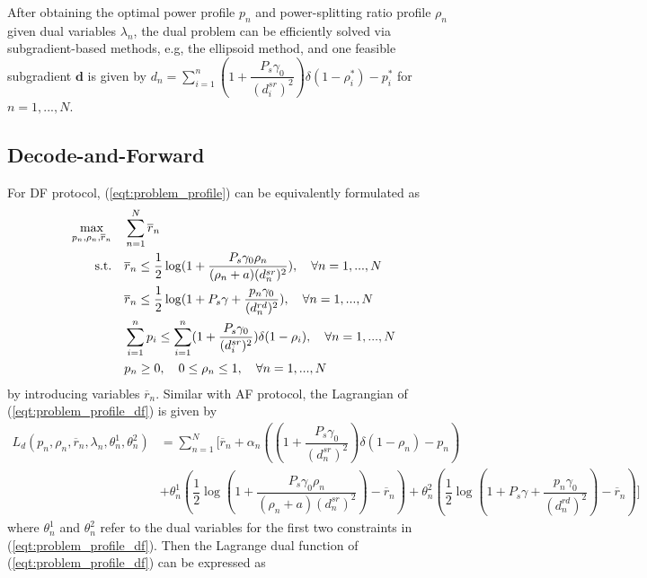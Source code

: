 \documentclass[12pt, draftclsnofoot, onecolumn]{IEEEtran}
\begin{document}
After obtaining the optimal power profile $p_{n}$ and power-splitting ratio profile $\rho_{n}$ given dual variables $\lambda_{n}$, the dual problem can be efficiently solved via subgradient-based methods, e.g, the ellipsoid method\cite{6760603}, and one feasible subgradient $\bm{d}$ is given by $d_{n}=\sum\limits _{i=1}^{n}(1+\dfrac{P_{s}\gamma_{0}}{(d^{sr}_{i})^{2}})\delta(1-\rho^{*}_{i})-p^{*}_{i}$ for $n=1,...,N$.

\subsection{Decode-and-Forward}
For DF protocol, (\ref{eqt:problem_profile}) can be equivalently formulated as 
\begin{equation}\label{eqt:problem_profile_df}
\begin{aligned}
\max\limits_{p_{n},\rho_{n},\overline{r}_{n}}\quad &\sum\limits _{n=1}^{N}\overline{r}_{n}\\
{\rm s.t.}\quad &\overline{r}_{n}\leq\dfrac{1}{2}\log (1+\dfrac{P_{s}\gamma_{0}\rho_{n}}{(\rho_{n}+a)(d^{sr}_{n})^{2}}),\quad\forall n=1,...,N\\
&\overline{r}_{n}\leq\dfrac{1}{2}\log (1+P_{s}\gamma+\dfrac{p_{n}\gamma_{0}}{(d^{rd}_{n})^{2}}),\quad\forall n=1,...,N\\
&\sum\limits _{i=1}^{n}p_{i}\leq\sum\limits _{i=1}^{n}(1+\dfrac{P_{s}\gamma_{0}}{(d^{sr}_{i})^{2}})\delta(1-\rho_{i}),\quad\forall n=1,...,N\\
&p_{n}\geq 0,\quad 0\leq\rho_{n}\leq 1, \quad \forall n=1,...,N
\end{aligned}
\end{equation}
by introducing variables $\overline{r}_{n}$. Similar with AF protocol, the Lagrangian of (\ref{eqt:problem_profile_df}) is given by
\begin{equation}\label{eqt:Lag_df}
\begin{aligned}
L_{d}(p_{n},\rho_{n},\overline{r}_{n},\lambda_{n},\theta^{1}_{n},\theta^{2}_{n})&=\sum\limits_{n=1}^{N}[\overline{r}_{n}+\alpha_{n}((1+\dfrac{P_{s}\gamma_{0}}{(d^{sr}_{n})^{2}})\delta(1-\rho_{n})-p_{n})\\
&+\theta^{1}_{n}(\dfrac{1}{2}\log (1+\dfrac{P_{s}\gamma_{0}\rho_{n}}{(\rho_{n}+a)(d^{sr}_{n})^{2}})-\overline{r}_{n})+\theta^{2}_{n}(\dfrac{1}{2}\log (1+P_{s}\gamma+\dfrac{p_{n}\gamma_{0}}{(d^{rd}_{n})^{2}})-\overline{r}_{n})]
\end{aligned}
\end{equation}
where $\theta^{1}_{n}$ and $\theta^{2}_{n}$ refer to the dual variables for the first two constraints in (\ref{eqt:problem_profile_df}). Then the Lagrange dual function of (\ref{eqt:problem_profile_df}) can be expressed as 
\end{document}

